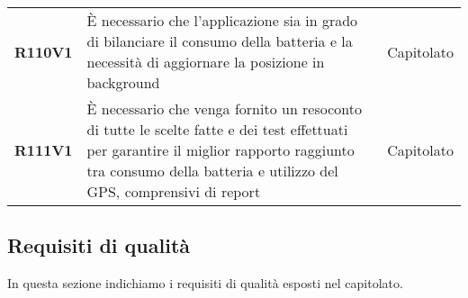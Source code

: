 \documentclass[../analisi-dei-requisiti.tex]{subfiles}
\begin{document}
\begin{longtable}[H]{>{\centering\bfseries}m{3cm} >{\centering}m{10cm} >{\centering\arraybackslash}m{3cm}}
  R110V1                               & È necessario che l'applicazione sia in grado di bilanciare il consumo della batteria e la necessità di aggiornare la posizione in background                                                                                                           & Capitolato                    \\
  R111V1                               & È necessario che venga fornito un resoconto di tutte le scelte fatte e dei test effettuati per garantire il miglior rapporto raggiunto tra consumo della batteria e utilizzo del GPS, comprensivi di report                                            & Capitolato                    \\
\end{longtable}

\newpage
\subsection{Requisiti di qualità}%
\label{sub:requisiti_di_qualita}
In questa sezione indichiamo i requisiti di qualità esposti nel capitolato.
\end{document}
